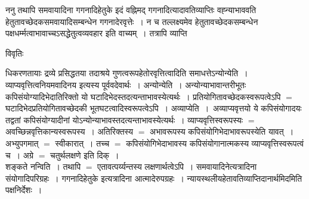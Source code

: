 \documentclass[10pt, openany]{book}
\begin{document}
{{\la ननु तथापि समवायादिना गगनादिहेतुके इदं वह्निमद् गगनादित्यादावतिव्याप्तिः वह्न्याभाववति हेतुतावच्छेदकसमवायादिसम्बन्धेन गगनादेरवृत्तेः~। न च तल्लक्ष्यमेव हेतुतावच्छेदकसम्बन्धेन पक्षधर्म्मत्वाभावाच्चऽसद्धेतुत्वव्यवहार इति वाच्यम्~।} 
तत्रापि व्याप्ति
\begin{center}     विवृतिः \end{center}

धिकरणतायाः द्रव्ये प्रसिद्धतया तदाश्रये गुणत्वरूपहेतोरवृत्तित्वादिति समाधत्तेऽन्योन्येति~। व्याप्यवृत्तित्वनियमवादिनय इत्यस्य पूर्ववदेवार्थः~। {\la अन्योन्येति~।}
अन्योन्याभावान्तरीभूतः कपिसंयोग्यादिभेदातिरिक्तो यो घटादिभेदस्तदत्यन्ताभावस्येत्यर्थः~। प्रतियोगितावच्छेदकस्वरूपत्वेऽपि $=$ घटादिभेदप्रतियोगितावच्छेदकी
भूतघटत्वादिस्वरूपत्वेऽपि~। {\qt अव्याप्येति~}।~अव्याप्यवृत्तयो ये कपिसंयोगादयः तद्वतां कपिसंयोग्यादीनां योऽन्योन्याभावस्तदत्यन्ताभावस्येत्यर्थः~। व्याप्यवृत्तिस्वरूपस्यः $=$ अवच्छिन्नवृत्तिकान्यस्वरूपस्य~। अतिरिक्तस्य $=$ अभावरूपस्य कपिसंयोगिभेदाभावरूपस्येति यावत्~। अभ्युपगमात् $=$ स्वीकारात्~। तच्च $=$ कपिसंयोगिभेदाभावस्य कपिसंयोगानात्मकस्य व्याप्यवृत्तिस्वरूपत्वं च~। अग्रे $=$ चतुर्थलक्षणे इति दिक्~।\\

शङ्कते {\la नन्विति~।} तथापि $=$ एतावत्पर्य्यन्तस्य लक्षणार्थत्वेऽपि~। समवायादिनेत्यत्रादिना संयोगादिपरिग्रहः~। गगनादिहेतुके इत्यत्रादिना आत्मादेरुपग्रहः~।
न्यायस्थलीयहेतावतिव्याप्तिदानार्थमिदमिति पक्षनिर्देशः~।\\

}
\end{document}
